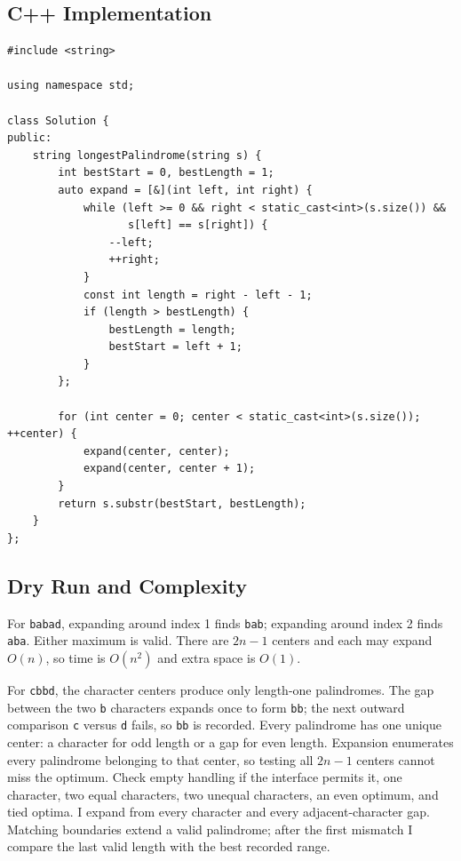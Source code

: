 \subsection{C++ Implementation}
\begin{lstlisting}[style=compactcode,caption={Complete C++ solution: Longest Palindromic Substring}]
#include <string>

using namespace std;

class Solution {
public:
    string longestPalindrome(string s) {
        int bestStart = 0, bestLength = 1;
        auto expand = [&](int left, int right) {
            while (left >= 0 && right < static_cast<int>(s.size()) &&
                   s[left] == s[right]) {
                --left;
                ++right;
            }
            const int length = right - left - 1;
            if (length > bestLength) {
                bestLength = length;
                bestStart = left + 1;
            }
        };

        for (int center = 0; center < static_cast<int>(s.size()); ++center) {
            expand(center, center);
            expand(center, center + 1);
        }
        return s.substr(bestStart, bestLength);
    }
};
\end{lstlisting}

\subsection{Dry Run and Complexity}
For \texttt{babad}, expanding around index 1 finds \texttt{bab}; expanding
around index 2 finds \texttt{aba}. Either maximum is valid. There are
\(2n-1\) centers and each may expand \(O(n)\), so time is \(O(n^2)\) and
extra space is \(O(1)\).

\lessonexpansion
  {For \texttt{cbbd}, the character centers produce only length-one
   palindromes. The gap between the two \texttt{b} characters expands once to
   form \texttt{bb}; the next outward comparison \texttt{c} versus
   \texttt{d} fails, so \texttt{bb} is recorded.}
  {Every palindrome has one unique center: a character for odd length or a
   gap for even length. Expansion enumerates every palindrome belonging to
   that center, so testing all \(2n-1\) centers cannot miss the optimum.}
  {Check empty handling if the interface permits it, one character, two equal
   characters, two unequal characters, an even optimum, and tied optima.}
  {I expand from every character and every adjacent-character gap. Matching
   boundaries extend a valid palindrome; after the first mismatch I compare
   the last valid length with the best recorded range.}

